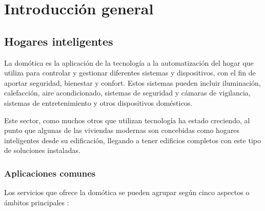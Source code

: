 
\chapter{Introducción general} %

\label{Chapter1} %
\label{IntroGeneral}


\newcommand{\keyword}[1]{\textbf{#1}}
\newcommand{\tabhead}[1]{\textbf{#1}}
\newcommand{\code}[1]{\texttt{#1}}
\newcommand{\file}[1]{\texttt{\bfseries#1}}
\newcommand{\option}[1]{\texttt{\itshape#1}}
\newcommand{\grados}{$^{\circ}$}



\section{Hogares inteligentes}

La domótica es la aplicación de la tecnología a la automatización del hogar que utiliza para controlar y gestionar diferentes sistemas y dispositivos, con el fin de aportar seguridad, bienestar y confort. Estos sistemas pueden incluir iluminación, calefacción, aire acondicionado, sistemas de seguridad y cámaras de vigilancia, sistemas de entretenimiento y otros dispositivos domésticos. \citep{1}

Este sector, como muchos otros que utilizan tecnología ha estado creciendo, al punto que algunas de las viviendas modernas son concebidas como hogares inteligentes desde su edificación, llegando a tener edificios completos con este tipo de soluciones instaladas.

\subsection{Aplicaciones comunes}

Los servicios que ofrece la domótica se pueden agrupar según cinco aspectos o ámbitos principales \citep{2}:

